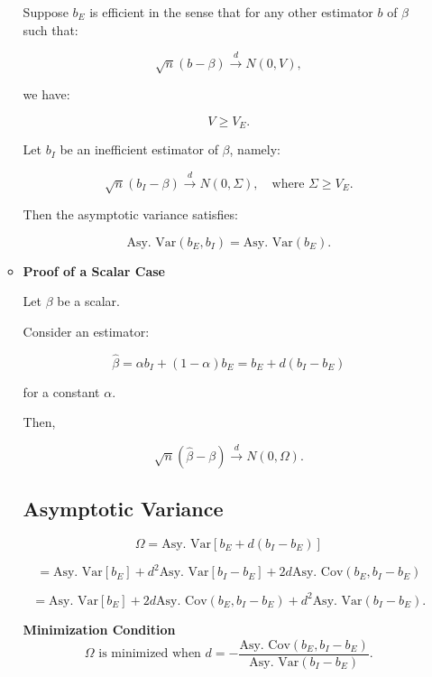 \documentclass[12pt, oneside]{article}
\begin{document}
\begin{enumerate}
\begin{itemize}
            Suppose \( b_E \) is efficient in the sense that for any other estimator \( b \) of \( \beta \) such that:

            \[
            \sqrt{n} (b - \beta) \xrightarrow{d} N(0, V),
            \]

            we have:

            \[
            V \geq V_E.
            \]

            Let \( b_I \) be an inefficient estimator of \( \beta \), namely:

            \[
            \sqrt{n} (b_I - \beta) \xrightarrow{d} N(0, \Sigma), \quad \text{where } \Sigma \geq V_E.
            \]

            Then the asymptotic variance satisfies:

            \[
            \text{Asy. Var}(b_E, b_I) = \text{Asy. Var}(b_E).
            \]
            \item \textbf{Proof of a Scalar Case}

            Let \( \beta \) be a scalar.
            
            Consider an estimator:
            
            \[
            \hat{\beta} = \alpha b_I + (1 - \alpha) b_E = b_E + d (b_I - b_E)
            \]
            
            for a constant \( \alpha \).
            
            Then,
            
            \[
            \sqrt{n} (\hat{\beta} - \beta) \xrightarrow{d} N(0, \Omega).
            \]
            
            \subsection*{Asymptotic Variance}
            \[
            \Omega = \text{Asy. Var}[b_E + d (b_I - b_E)]
            \]
            
            \[
            = \text{Asy. Var}[b_E] + d^2 \text{Asy. Var}[b_I - b_E] + 2 d \text{Asy. Cov}(b_E, b_I - b_E)
            \]
            
            \[
            = \text{Asy. Var}[b_E] + 2 d \text{Asy. Cov}(b_E, b_I - b_E) + d^2 \text{Asy. Var}(b_I - b_E).
            \]
            
            \textbf{Minimization Condition}
            \[
            \Omega \text{ is minimized when } d = - \frac{\text{Asy. Cov}(b_E, b_I - b_E)}{\text{Asy. Var}(b_I - b_E)}.
            \]
            

\end{itemize}
\end{enumerate}
\end{document}
